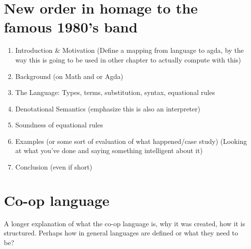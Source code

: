 \documentclass[11pt]{article} %
\begin{document}
\section{New order in homage to the famous 1980's band}
\begin{enumerate}
	\item Introduction \& Motivation (Define a mapping from language to agda, by the way this is going to be used in other chapter to actually compute with this)
	\item Background (on Math and or Agda) %
	\item The Language: Types, terms, substitution, syntax, equational rules 
	\item Denotational Semantics (emphasize this is also an interpreter)
	\item Soundness of equational rules
	\item Examples (or some sort of evaluation of what happened/case study) (Looking at what you've done and saying something intelligent about it)
	\item Conclusion (even if short)
\end{enumerate}



\section{Co-op language}
A longer explanation of what the co-op language is, why it was created, how it is structured. Perhaps how in general languages are defined or what they need to be?
\end{document}
